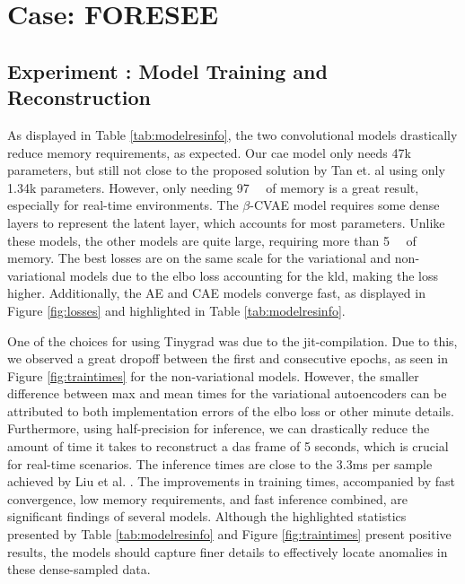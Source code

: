 \section{Case: FORESEE}
\label{disc:foresee}

\subsection{Experiment : Model Training and Reconstruction}

As displayed in Table \ref{tab:modelresinfo}, the two convolutional models drastically reduce memory requirements, as expected. Our \acrshort{cae} model only needs 47k parameters, but still not close to the proposed solution by Tan et. al \cite{tan2023improving} using only 1.34k parameters. However, only needing \qty{97}{\si{\kilo\byte}} of memory is a great result, especially for real-time environments. The $\beta$-CVAE model requires some dense layers to represent the latent layer, which accounts for most parameters. Unlike these models, the other models are quite large, requiring more than \qty{5}{\si{\giga\byte}} of memory. The best losses are on the same scale for the variational and non-variational models due to the \acrshort{elbo} loss accounting for the \acrshort{kld}, making the loss higher. Additionally, the AE and CAE models converge fast, as displayed in Figure \ref{fig:losses} and highlighted in Table \ref{tab:modelresinfo}. 

One of the choices for using Tinygrad was due to the \acrshort{jit}-compilation. Due to this, we observed a great dropoff between the first and consecutive epochs, as seen in Figure \ref{fig:traintimes} for the non-variational models. However, the smaller difference between max and mean times for the variational autoencoders can be attributed to both implementation errors of the \acrshort{elbo} loss or other minute details. Furthermore, using half-precision for inference, we can drastically reduce the amount of time it takes to reconstruct a \acrshort{das} frame of 5 seconds, which is crucial for real-time scenarios. The inference times are close to the 3.3ms per sample achieved by Liu et al. \cite{photonics9100677}. The improvements in training times, accompanied by fast convergence, low memory requirements, and fast inference combined, are significant findings of several models. Although the highlighted statistics presented by Table \ref{tab:modelresinfo} and Figure \ref{fig:traintimes} present positive results, the models should capture finer details to effectively locate anomalies in these dense-sampled data. 

